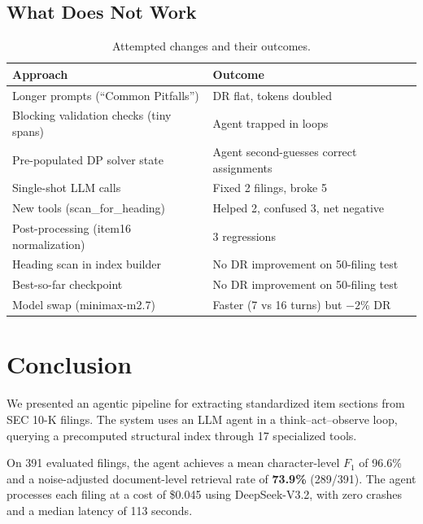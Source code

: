 \documentclass[11pt,a4paper]{article}
\begin{document}
\subsection{What Does Not Work}

\begin{table}[H]
\centering
\caption{Attempted changes and their outcomes.}
\begin{tabular}{>{\raggedright}p{6cm}l}
\toprule
\textbf{Approach} & \textbf{Outcome}\\
\midrule
Longer prompts (``Common Pitfalls'') & DR flat, tokens doubled\\
Blocking validation checks (tiny spans) & Agent trapped in loops\\
Pre-populated DP solver state & Agent second-guesses correct assignments\\
Single-shot LLM calls & Fixed 2 filings, broke 5\\
New tools (scan\_for\_heading) & Helped 2, confused 3, net negative\\
Post-processing (item16 normalization) & 3 regressions\\
Heading scan in index builder & No DR improvement on 50-filing test\\
Best-so-far checkpoint & No DR improvement on 50-filing test\\
Model swap (minimax-m2.7) & Faster (7 vs 16 turns) but $-2\%$ DR\\
\bottomrule
\end{tabular}
\end{table}


\section{Conclusion}

We presented an agentic pipeline for extracting standardized item sections from SEC 10-K filings. The system uses an LLM agent in a think--act--observe loop, querying a precomputed structural index through 17 specialized tools.

On 391 evaluated filings, the agent achieves a mean character-level $F_1$ of 96.6\% and a noise-adjusted document-level retrieval rate of \textbf{73.9\%} (289/391). The agent processes each filing at a cost of \$0.045 using DeepSeek-V3.2, with zero crashes and a median latency of 113 seconds.
\end{document}
